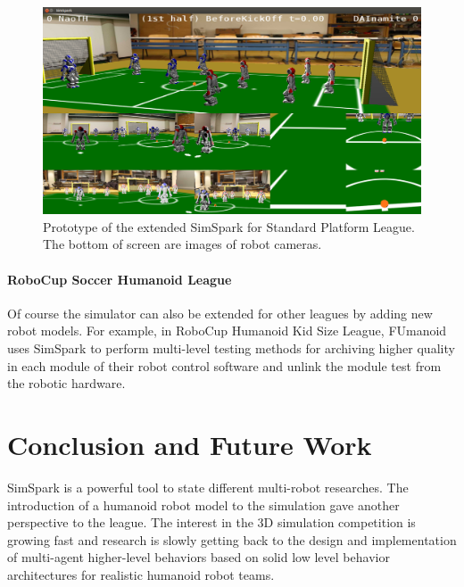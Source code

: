 \documentclass{llncs}
\begin{document}
\begin{figure}
  \centering
  \includegraphics[width = 0.75\columnwidth]{simspark-spl}
  \caption{Prototype of the extended SimSpark for Standard Platform League.
    The bottom of screen are images of robot cameras.}
  \label{f:simspark-spl}
\end{figure}

\paragraph{RoboCup Soccer Humanoid League}
Of course the simulator can also be extended for other leagues by adding new robot models.
For example, in RoboCup Humanoid Kid Size League, FUmanoid\cite{Donat2012} uses
SimSpark to perform multi-level testing methods for archiving higher
quality in each module of their robot control software and unlink the
module test from the robotic hardware.


\section{Conclusion and Future Work}
\label{s:conclusion}
SimSpark is a powerful tool to state different multi-robot researches.
The introduction of a humanoid robot model to the simulation gave another perspective to the league.
The interest in the 3D simulation competition is growing fast and research is slowly getting back to the design and implementation of multi-agent higher-level behaviors based on solid low level behavior architectures for realistic humanoid robot teams.
\end{document}
